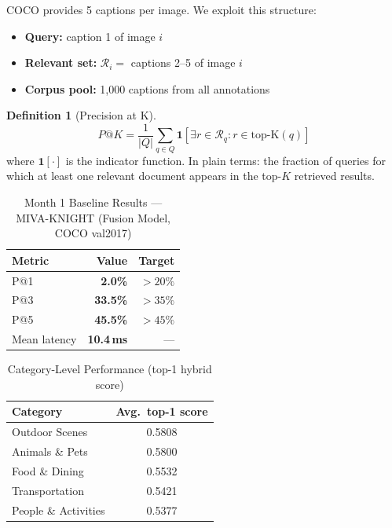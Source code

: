 \documentclass[12pt,a4paper]{article}
\theoremstyle{definition}
\newtheorem{definition}{Definition}[section]
\theoremstyle{plain}
\theoremstyle{remark}
\begin{document}
COCO provides 5 captions per image. We exploit this structure:
\begin{itemize}
  \item \textbf{Query:} caption 1 of image $i$
  \item \textbf{Relevant set:} $\mathcal{R}_i =$ captions 2--5 of image $i$
  \item \textbf{Corpus pool:} 1,000 captions from all annotations
\end{itemize}

\begin{definition}[Precision at K]
\[
  P@K = \frac{1}{|Q|}\sum_{q \in Q} \mathbf{1}\!\left[\exists r \in \mathcal{R}_q : r \in \mathrm{top\text{-}K}(q)\right]
\]
where $\mathbf{1}[\cdot]$ is the indicator function.
In plain terms: the fraction of queries for which at least one relevant document
appears in the top-$K$ retrieved results.
\end{definition}

\begin{table}[htbp]
\centering
\caption{Month 1 Baseline Results — MIVA-KNIGHT (Fusion Model, COCO val2017)}
\label{tab:results}
\begin{tabular}{lrr}
\toprule
Metric & Value & Target \\
\midrule
P@1 & \textbf{2.0\%}  & $>20\%$ \\
P@3 & \textbf{33.5\%} & $>35\%$ \\
P@5 & \textbf{45.5\%} & $>45\%$ \\
Mean latency & \textbf{10.4\,ms} & --- \\
\bottomrule
\end{tabular}
\end{table}

\begin{table}[htbp]
\centering
\caption{Category-Level Performance (top-1 hybrid score)}
\begin{tabular}{lc}
\toprule
Category & Avg.\ top-1 score \\
\midrule
Outdoor Scenes      & 0.5808 \\
Animals \& Pets     & 0.5800 \\
Food \& Dining      & 0.5532 \\
Transportation      & 0.5421 \\
People \& Activities& 0.5377 \\
\bottomrule
\end{tabular}
\end{table}
\end{document}
